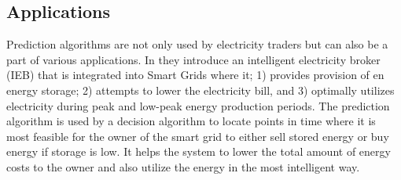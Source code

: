 \documentclass[twoside,11pt,openright]{report}
\begin{document}
\subsection{Applications}
Prediction algorithms are not only used by electricity traders but can also be a part of various applications. In \cite{22} they introduce an intelligent electricity broker (IEB) that is integrated into Smart Grids where it; 1) provides provision of en energy storage; 2) attempts to lower the electricity bill, and 3) optimally utilizes electricity during peak and low-peak energy production periods. The prediction algorithm is used by a decision algorithm to locate points in time where it is most feasible for the owner of the smart grid to either sell stored energy or buy energy if storage is low. It helps the system to lower the total amount of energy costs to the owner and also utilize the energy in the most intelligent way.
\end{document}
